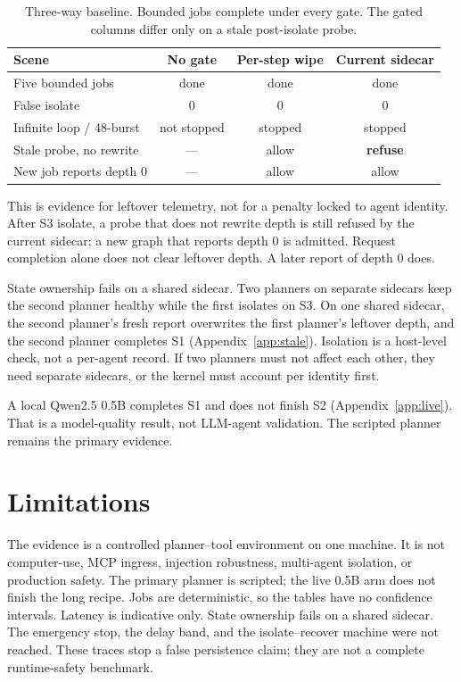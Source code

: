 \documentclass[11pt,a4paper]{article}
\begin{document}
\begin{table}[htbp]
\caption{Three-way baseline. Bounded jobs complete under every gate. The gated columns differ only on a stale post-isolate probe.}
\label{tab:threeway}
\centering
\begin{tabular}{@{}lccc@{}}
\toprule
Scene & No gate & Per-step wipe & Current sidecar \\
\midrule
Five bounded jobs & done & done & done \\
False isolate & $0$ & $0$ & $0$ \\
Infinite loop / 48-burst & not stopped & stopped & stopped \\
Stale probe, no rewrite & --- & allow & \textbf{refuse} \\
New job reports depth $0$ & --- & allow & allow \\
\bottomrule
\end{tabular}
\end{table}

This is evidence for leftover telemetry, not for a penalty locked to agent identity.
After S3 isolate, a probe that does not rewrite depth is still refused by the current sidecar; a new graph that reports depth $0$ is admitted.
Request completion alone does not clear leftover depth.
A later report of depth $0$ does.

State ownership fails on a shared sidecar.
Two planners on separate sidecars keep the second planner healthy while the first isolates on S3.
On one shared sidecar, the second planner's fresh report overwrites the first planner's leftover depth, and the second planner completes S1 (Appendix~\ref{app:stale}).
Isolation is a host-level check, not a per-agent record.
If two planners must not affect each other, they need separate sidecars, or the kernel must account per identity first.

A local Qwen2.5 0.5B completes S1 and does not finish S2 (Appendix~\ref{app:live}).
That is a model-quality result, not LLM-agent validation.
The scripted planner remains the primary evidence.

\section{Limitations}
\label{sec:limitations}

The evidence is a controlled planner--tool environment on one machine.
It is not computer-use, MCP ingress, injection robustness, multi-agent isolation, or production safety.
The primary planner is scripted; the live 0.5B arm does not finish the long recipe.
Jobs are deterministic, so the tables have no confidence intervals.
Latency is indicative only.
State ownership fails on a shared sidecar.
The emergency stop, the delay band, and the isolate--recover machine were not reached.
These traces stop a false persistence claim; they are not a complete runtime-safety benchmark.
\end{document}
